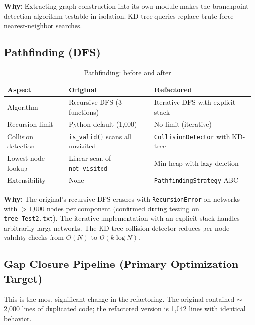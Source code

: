 \documentclass[11pt,a4paper]{article}
\begin{document}
\textbf{Why:} Extracting graph construction into its own module makes the branchpoint detection algorithm testable in isolation. KD-tree queries replace brute-force nearest-neighbor searches.

\subsection{Pathfinding (DFS)}

\begin{table}[H]
\centering
\caption{Pathfinding: before and after}
\begin{tabularx}{\textwidth}{lXX}
\toprule
\textbf{Aspect} & \textbf{Original} & \textbf{Refactored} \\
\midrule
Algorithm & Recursive DFS (3 functions) & Iterative DFS with explicit stack \\
Recursion limit & Python default (1,000) & No limit (iterative) \\
Collision detection & \texttt{is\_valid()} scans all unvisited & \texttt{CollisionDetector} with KD-tree \\
Lowest-node lookup & Linear scan of \texttt{not\_visited} & Min-heap with lazy deletion \\
Extensibility & None & \texttt{PathfindingStrategy} ABC \\
\bottomrule
\end{tabularx}
\end{table}

\textbf{Why:} The original's recursive DFS crashes with \texttt{RecursionError} on networks with $>$1,000 nodes per component (confirmed during testing on \texttt{tree\_Test2.txt}). The iterative implementation with an explicit stack handles arbitrarily large networks. The KD-tree collision detector reduces per-node validity checks from $O(N)$ to $O(k \log N)$.

\subsection{Gap Closure Pipeline (Primary Optimization Target)}

This is the most significant change in the refactoring. The original contained $\sim$2,000 lines of duplicated code; the refactored version is 1,042 lines with identical behavior.
\end{document}
